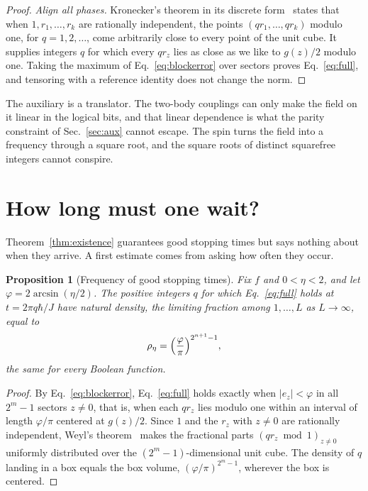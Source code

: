 \documentclass[11pt,a4paper]{article}
\newtheorem{proposition}[theorem]{Proposition}
\begin{document}
\begin{proof}
\emph{Align all phases.} Kronecker's theorem in its discrete form~\cite{Weyl1916,Cameron2014} states that when $1,r_1,\ldots,r_k$ are rationally independent, the points $(qr_1,\ldots,qr_k)$ modulo one, for $q=1,2,\ldots$, come arbitrarily close to every point of the unit cube. It supplies integers $q$ for which every $qr_z$ lies as close as we like to $g(z)/2$ modulo one. Taking the maximum of Eq.~\eqref{eq:blockerror} over sectors proves Eq.~\eqref{eq:full}, and tensoring with a reference identity does not change the norm.
\end{proof}

The auxiliary is a translator. The two-body couplings can only make the field on it linear in the logical bits, and that linear dependence is what the parity constraint of Sec.~\ref{sec:aux} cannot escape. The spin turns the field into a frequency through a square root, and the square roots of distinct squarefree integers cannot conspire.

\section{How long must one wait?}
\label{sec:density}

Theorem~\ref{thm:existence} guarantees good stopping times but says nothing about when they arrive. A first estimate comes from asking how often they occur.

\begin{proposition}[Frequency of good stopping times]
\label{prop:density}
Fix $f$ and $0<\eta<2$, and let $\varphi=2\arcsin(\eta/2)$. The positive integers $q$ for which Eq.~\eqref{eq:full} holds at $t=2\pi q\hbar/J$ have natural density, the limiting fraction among $1,\ldots,L$ as $L\to\infty$, equal to
\begin{equation}
 \rho_\eta=\Bigl(\frac{\varphi}{\pi}\Bigr)^{2^{n+1}-1},
 \label{eq:density}
\end{equation}
the same for every Boolean function.
\end{proposition}

\begin{proof}
By Eq.~\eqref{eq:blockerror}, Eq.~\eqref{eq:full} holds exactly when $|e_z|<\varphi$ in all $2^m-1$ sectors $z\ne0$, that is, when each $qr_z$ lies modulo one within an interval of length $\varphi/\pi$ centered at $g(z)/2$. Since $1$ and the $r_z$ with $z\ne0$ are rationally independent, Weyl's theorem~\cite{Weyl1916} makes the fractional parts $(qr_z\bmod1)_{z\ne0}$ uniformly distributed over the $(2^m-1)$-dimensional unit cube. The density of $q$ landing in a box equals the box volume, $(\varphi/\pi)^{2^m-1}$, wherever the box is centered.
\end{proof}
\end{document}
